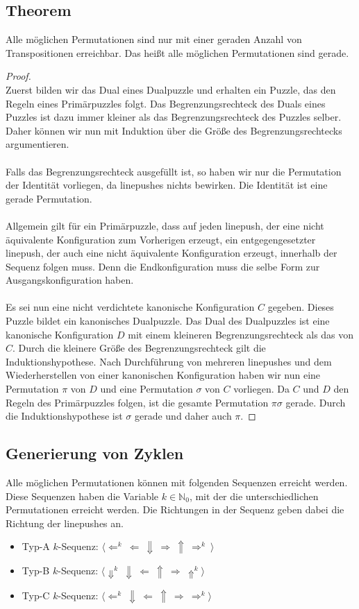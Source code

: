 \documentclass[seminar,german]{algothesis}
\begin{document}
\subsection{Theorem}
Alle möglichen Permutationen sind nur mit einer geraden Anzahl von Transpositionen erreichbar. Das heißt alle möglichen Permutationen sind gerade.
\begin{proof}\noindent\\
Zuerst bilden wir das Dual eines Dualpuzzle und erhalten ein Puzzle, das den Regeln eines Primärpuzzles folgt. Das Begrenzungsrechteck des Duals eines Puzzles ist dazu immer kleiner als das Begrenzungsrechteck des Puzzles selber. Daher können wir nun mit Induktion über die Größe des Begrenzungsrechtecks argumentieren.\\\\
Falls das Begrenzungsrechteck ausgefüllt ist, so haben wir nur die Permutation der Identität vorliegen, da linepushes nichts bewirken. Die Identität ist eine gerade Permutation.\\\\
Allgemein gilt für ein Primärpuzzle, dass auf jeden linepush, der eine nicht äquivalente Konfiguration zum Vorherigen erzeugt, ein entgegengesetzter linepush, der auch eine nicht äquivalente Konfiguration erzeugt, innerhalb der Sequenz folgen muss. Denn die Endkonfiguration muss die selbe Form zur Ausgangskonfiguration haben.\\\\
Es sei nun eine nicht verdichtete kanonische Konfiguration $C$ gegeben. Dieses Puzzle bildet ein kanonisches Dualpuzzle. Das Dual des Dualpuzzles ist eine kanonische Konfiguration $D$ mit einem kleineren Begrenzungsrechteck als das von $C$. Durch die kleinere Größe des Begrenzungsrechteck gilt die Induktionshypothese. Nach Durchführung von mehreren linepushes und dem Wiederherstellen von einer kanonischen Konfiguration haben wir nun eine Permutation $\pi$ von $D$  und eine Permutation $\sigma$ von $C$ vorliegen. Da $C$ und $D$ den Regeln des Primärpuzzles folgen, ist die gesamte Permutation $\pi\sigma$ gerade. Durch die Induktionshypothese ist $\sigma$ gerade und daher auch $\pi$.
\end{proof}

\subsection{Generierung von Zyklen}
Alle möglichen Permutationen können mit folgenden Sequenzen erreicht werden. Diese Sequenzen haben die Variable $k\in \mathbb{N}_0$, mit der die unterschiedlichen Permutationen erreicht werden. Die Richtungen in der Sequenz geben dabei die Richtung der linepushes an.
\begin{itemize}
		\item Typ-A $k$-Sequenz: $\langle  \Leftarrow^k~ \Leftarrow ~\Downarrow~ \Rightarrow ~\Uparrow ~\Rightarrow^k ~\rangle$
		\item Typ-B $k$-Sequenz: $\langle \Downarrow^k ~\Downarrow ~\Leftarrow ~\Uparrow~ \Rightarrow ~\Uparrow ^k\rangle$
		\item Typ-C $k$-Sequenz: $\langle \Leftarrow^k~ \Downarrow ~\Leftarrow~ \Uparrow ~\Rightarrow ~ \Rightarrow^k \rangle$
	\end{itemize}
	
\end{document}
